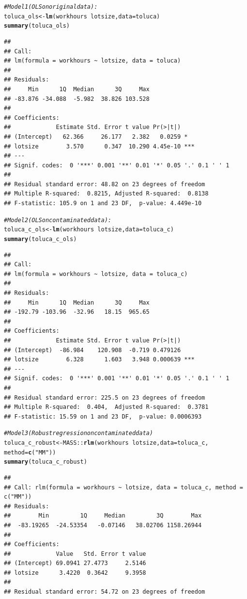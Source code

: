 \documentclass{article}\usepackage[]{graphicx}\usepackage[]{color}
\makeatletter
\newcommand{\hlstr}[1]{\textcolor[rgb]{0.192,0.494,0.8}{#1}}%
\newcommand{\hlcom}[1]{\textcolor[rgb]{0.678,0.584,0.686}{\textit{#1}}}%
\newcommand{\hlopt}[1]{\textcolor[rgb]{0,0,0}{#1}}%
\newcommand{\hlstd}[1]{\textcolor[rgb]{0.345,0.345,0.345}{#1}}%
\newcommand{\hlkwb}[1]{\textcolor[rgb]{0.69,0.353,0.396}{#1}}%
\newcommand{\hlkwc}[1]{\textcolor[rgb]{0.333,0.667,0.333}{#1}}%
\newcommand{\hlkwd}[1]{\textcolor[rgb]{0.737,0.353,0.396}{\textbf{#1}}}%
\newenvironment{kframe}{%
 \def\at@end@of@kframe{}%
 \ifinner\ifhmode%
  \def\at@end@of@kframe{\end{minipage}}%
  \begin{minipage}{\columnwidth}%
 \fi\fi%
 \def\FrameCommand##1{\hskip\@totalleftmargin \hskip-\fboxsep
 \colorbox{shadecolor}{##1}\hskip-\fboxsep
     \hskip-\linewidth \hskip-\@totalleftmargin \hskip\columnwidth}%
 \MakeFramed {\advance\hsize-\width
   \@totalleftmargin\z@ \linewidth\hsize
   \@setminipage}}%
 {\par\unskip\endMakeFramed%
 \at@end@of@kframe}
\newenvironment{knitrout}{}{} %
\makeatother
\begin{document}
\begin{knitrout}
\color{fgcolor}\begin{kframe}
\begin{alltt}
\hlcom{# Model 1 (OLS on original data):}
\hlstd{toluca_ols} \hlkwb{<-} \hlkwd{lm}\hlstd{(workhours} \hlopt{~} \hlstd{lotsize,} \hlkwc{data} \hlstd{= toluca)}
\hlkwd{summary}\hlstd{(toluca_ols)}
\end{alltt}
\begin{verbatim}
## 
## Call:
## lm(formula = workhours ~ lotsize, data = toluca)
## 
## Residuals:
##     Min      1Q  Median      3Q     Max 
## -83.876 -34.088  -5.982  38.826 103.528 
## 
## Coefficients:
##             Estimate Std. Error t value Pr(>|t|)    
## (Intercept)   62.366     26.177   2.382   0.0259 *  
## lotsize        3.570      0.347  10.290 4.45e-10 ***
## ---
## Signif. codes:  0 '***' 0.001 '**' 0.01 '*' 0.05 '.' 0.1 ' ' 1
## 
## Residual standard error: 48.82 on 23 degrees of freedom
## Multiple R-squared:  0.8215,	Adjusted R-squared:  0.8138 
## F-statistic: 105.9 on 1 and 23 DF,  p-value: 4.449e-10
\end{verbatim}
\begin{alltt}
\hlcom{# Model 2 (OLS on contaminated data):}
\hlstd{toluca_c_ols} \hlkwb{<-} \hlkwd{lm}\hlstd{(workhours} \hlopt{~} \hlstd{lotsize,} \hlkwc{data} \hlstd{= toluca_c)}
\hlkwd{summary}\hlstd{(toluca_c_ols)}
\end{alltt}
\begin{verbatim}
## 
## Call:
## lm(formula = workhours ~ lotsize, data = toluca_c)
## 
## Residuals:
##     Min      1Q  Median      3Q     Max 
## -192.79 -103.96  -32.96   18.15  965.65 
## 
## Coefficients:
##             Estimate Std. Error t value Pr(>|t|)    
## (Intercept)  -86.984    120.908  -0.719 0.479126    
## lotsize        6.328      1.603   3.948 0.000639 ***
## ---
## Signif. codes:  0 '***' 0.001 '**' 0.01 '*' 0.05 '.' 0.1 ' ' 1
## 
## Residual standard error: 225.5 on 23 degrees of freedom
## Multiple R-squared:  0.404,	Adjusted R-squared:  0.3781 
## F-statistic: 15.59 on 1 and 23 DF,  p-value: 0.0006393
\end{verbatim}
\begin{alltt}
\hlcom{# Model 3 (Robust regression on contaminated data)}
\hlstd{toluca_c_robust} \hlkwb{<-} \hlstd{MASS}\hlopt{::}\hlkwd{rlm}\hlstd{(workhours} \hlopt{~} \hlstd{lotsize,} \hlkwc{data} \hlstd{= toluca_c,}
                             \hlkwc{method} \hlstd{=} \hlkwd{c}\hlstd{(}\hlstr{"MM"}\hlstd{))}
\hlkwd{summary}\hlstd{(toluca_c_robust)}
\end{alltt}
\begin{verbatim}
## 
## Call: rlm(formula = workhours ~ lotsize, data = toluca_c, method = c("MM"))
## Residuals:
##        Min         1Q     Median         3Q        Max 
##  -83.19265  -24.53354   -0.07146   38.02706 1158.26944 
## 
## Coefficients:
##             Value   Std. Error t value
## (Intercept) 69.0941 27.4773     2.5146
## lotsize      3.4220  0.3642     9.3958
## 
## Residual standard error: 54.72 on 23 degrees of freedom
\end{verbatim}
\end{kframe}
\end{knitrout}
\end{document}
